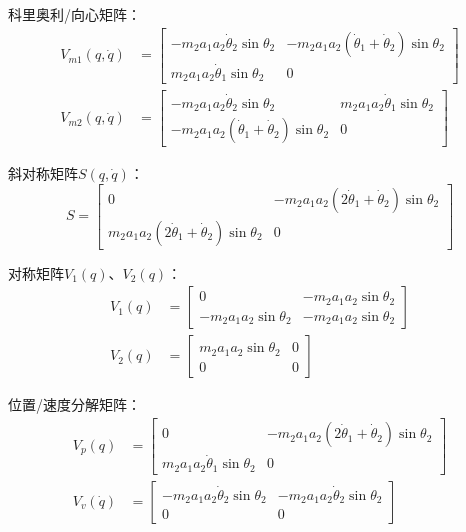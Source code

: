 \documentclass[12pt,a4paper]{ctexart}
\begin{document}
科里奥利/向心矩阵：
\begin{align}
V_{m1}(q,\dot{q}) &= \begin{bmatrix} -m_2a_1a_2\dot{\theta}_2\sin\theta_2 & -m_2a_1a_2(\dot{\theta}_1+\dot{\theta}_2)\sin\theta_2 \\ m_2a_1a_2\dot{\theta}_1\sin\theta_2 & 0 \end{bmatrix} \\
V_{m2}(q,\dot{q}) &= \begin{bmatrix} -m_2a_1a_2\dot{\theta}_2\sin\theta_2 & m_2a_1a_2\dot{\theta}_1\sin\theta_2 \\ -m_2a_1a_2(\dot{\theta}_1+\dot{\theta}_2)\sin\theta_2 & 0 \end{bmatrix}
\end{align}

斜对称矩阵$S(q,\dot{q})$：
\begin{equation}
S = \begin{bmatrix} 0 & -m_2a_1a_2(2\dot{\theta}_1+\dot{\theta}_2)\sin\theta_2 \\ m_2a_1a_2(2\dot{\theta}_1+\dot{\theta}_2)\sin\theta_2 & 0 \end{bmatrix}
\end{equation}

对称矩阵$V_1(q)$、$V_2(q)$：
\begin{align}
V_1(q) &= \begin{bmatrix} 0 & -m_2a_1a_2\sin\theta_2 \\ -m_2a_1a_2\sin\theta_2 & -m_2a_1a_2\sin\theta_2 \end{bmatrix} \\
V_2(q) &= \begin{bmatrix} m_2a_1a_2\sin\theta_2 & 0 \\ 0 & 0 \end{bmatrix}
\end{align}

位置/速度分解矩阵：
\begin{align}
V_p(q) &= \begin{bmatrix} 0 & -m_2a_1a_2(2\dot{\theta}_1+\dot{\theta}_2)\sin\theta_2 \\ m_2a_1a_2\dot{\theta}_1\sin\theta_2 & 0 \end{bmatrix} \\
V_v(\dot{q}) &= \begin{bmatrix} -m_2a_1a_2\dot{\theta}_2\sin\theta_2 & -m_2a_1a_2\dot{\theta}_2\sin\theta_2 \\ 0 & 0 \end{bmatrix}
\end{align}
\end{document}
